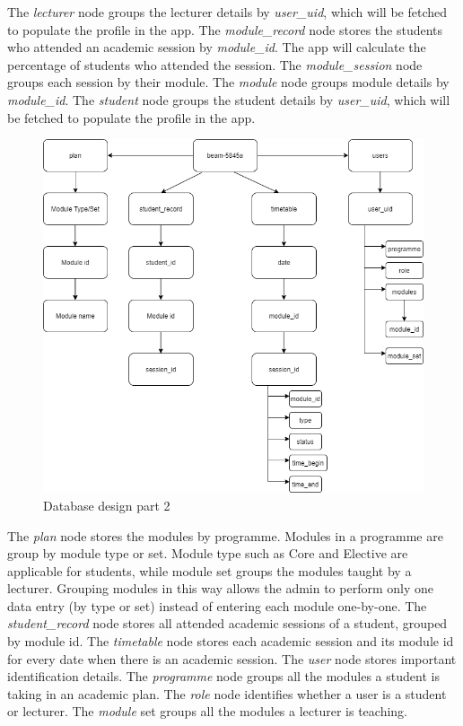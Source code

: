 \documentclass[../report.tex]{subfiles}
\begin{document}
The \textit{lecturer} node groups the lecturer details by \textit{user\_uid}, which will be fetched to populate the profile in the app. The \textit{module\_record} node stores the students who attended an academic session by \textit{module\_id}. The app will calculate the percentage of students who attended the session. The \textit{module\_session} node groups each session by their module. The \textit{module} node groups module details by \textit{module\_id}. The \textit{student} node groups the student details by \textit{user\_uid}, which will be fetched to populate the profile in the app.

\begin{figure}[H]
\centering
\includegraphics[width=\textwidth]{./images/05-08-database-2.png}
\caption{Database design part 2}
\label{fig:database-design-2}
\end{figure}

The \textit{plan} node stores the modules by programme. Modules in a programme are group by module type or set. Module type such as Core and Elective are applicable for students, while module set groups the modules taught by a lecturer. Grouping modules in this way allows the admin to perform only one data entry (by type or set) instead of entering each module one-by-one. The \textit{student\_record} node stores all attended academic sessions of a student, grouped by module id. The \textit{timetable} node stores each academic session and its module id for every date when there is an academic session. The \textit{user} node stores important identification details. The \textit{programme} node groups all the modules a student is taking in an academic plan. The \textit{role} node identifies whether a user is a student or lecturer. The \textit{module} set groups all the modules a lecturer is teaching. 
\end{document}
